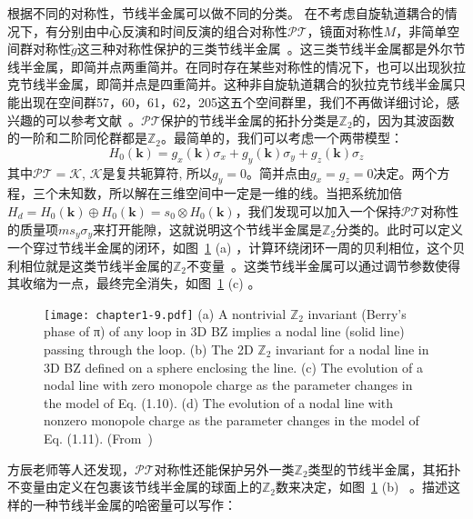 根据不同的对称性，节线半金属可以做不同的分类。
在不考虑自旋轨道耦合的情况下，有分别由中心反演和时间反演的组合对称性$\mathcal{PT}$，镜面对称性$M$，非简单空间群对称性$\tilde{g}$这三种对称性保护的三类节线半金属~\citep{fang2015nl,Fang2016cpb}。这三类节线半金属都是外尔节线半金属，即简并点两重简并。在同时存在某些对称性的情况下，也可以出现狄拉克节线半金属，即简并点是四重简并。这种非自旋轨道耦合的狄拉克节线半金属只能出现在空间群57，60，61，62，205这五个空间群里，我们不再做详细讨论，感兴趣的可以参考文献~\cite{Li2021,Yu2021}。$\mathcal{PT}$保护的节线半金属的拓扑分类是$\mathbb{Z}_2$的，因为其波函数的一阶和二阶同伦群都是$\mathbb{Z}_2$。最简单的，我们可以考虑一个两带模型：
\begin{equation}
    \label{eq:1-10}
    H_{0}(\mathbf{k})=g_{x}(\mathbf{k}) \sigma_{x}+g_{y}(\mathbf{k}) \sigma_{y}+g_{z}(\mathbf{k}) \sigma_{z}
\end{equation}
其中$\mathcal{PT}=\mathcal{K}$, $\mathcal{K}$是复共轭算符, 所以$g_{y}=0$。简并点由$g_{x}=g_{z}=0$决定。两个方程，三个未知数，所以解在三维空间中一定是一维的线。当把系统加倍$H_{d}=H_{0}(\mathbf{k}) \oplus H_{0}(\mathbf{k})=s_{0} \otimes H_{0}(\mathbf{k})$，我们发现可以加入一个保持$\mathcal{PT}$对称性的质量项$m s_{y} \sigma_{y}$来打开能隙，这就说明这个节线半金属是$\mathbb{Z}_2$分类的。此时可以定义一个穿过节线半金属的闭环，如图~\ref{fig:1-9} (a) ，计算环绕闭环一周的贝利相位，这个贝利相位就是这类节线半金属的$\mathbb{Z}_2$不变量~\citep{kim2015nl}。这类节线半金属可以通过调节参数使得其收缩为一点，最终完全消失，如图~\ref{fig:1-9} (c) 。
\begin{figure}[!htbp]
    \centering
    \texttt{[image: chapter1-9.pdf]}
    { (a) A nontrivial $\mathbb{Z}_2$ invariant (Berry’s phase of π) of any loop in 3D BZ implies a nodal line (solid line) passing through the loop. (b) The 2D $\mathbb{Z}_2$ invariant for a nodal line in 3D BZ defined on a sphere enclosing the line. (c) The evolution of a nodal line with zero monopole charge as the parameter changes in the model of Eq. (1.10). (d) The evolution of a nodal line with nonzero monopole charge as the parameter changes in the model of Eq. (1.11). (From~\citep{fang2015nl})}
    \label{fig:1-9}
\end{figure}
方辰老师等人还发现，$\mathcal{PT}$对称性还能保护另外一类$\mathbb{Z}_2$类型的节线半金属，其拓扑不变量由定义在包裹该节线半金属的球面上的$\mathbb{Z}_2$数来决定，如图~\ref{fig:1-9} (b) ~\citep{fang2015nl,Fang2016cpb}。描述这样的一种节线半金属的哈密量可以写作：
